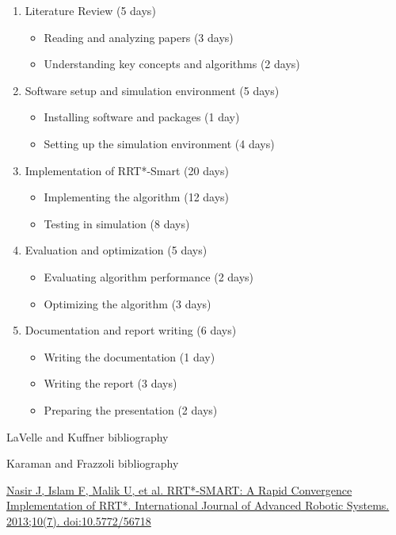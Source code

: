 \documentclass[12pt]{extarticle}
\begin{document}
\begin{enumerate}
	\item Literature Review (5 days)
	\begin{itemize}
		\item Reading and analyzing papers (3 days)
		\item Understanding key concepts and algorithms (2 days)
	\end{itemize}
	
	\item Software setup and simulation environment (5 days)
	\begin{itemize}
		\item Installing software and packages (1 day)
		\item Setting up the simulation environment (4 days)
	\end{itemize}
	
	\item Implementation of RRT*-Smart (20 days)
	\begin{itemize}
		\item Implementing the algorithm (12 days)
		\item Testing in simulation (8 days)
	\end{itemize}

	\item Evaluation and optimization (5 days)
	\begin{itemize}
		\item Evaluating algorithm performance (2 days)
		\item Optimizing the algorithm (3 days)
	\end{itemize}

	\item Documentation and report writing (6 days)
	\begin{itemize}
		\item Writing the documentation (1 day)
		\item Writing the report (3 days)
		\item Preparing the presentation (2 days)
	\end{itemize}
\end{enumerate}
\newpage
\begin{thebibliography}{9}
	LaVelle and Kuffner bibliography

	Karaman and Frazzoli bibliography
	
	\href{https://journals.sagepub.com/doi/10.5772/56718}{Nasir J, Islam F, Malik U, et al. RRT*-SMART: A Rapid Convergence Implementation of RRT*. International Journal of Advanced Robotic Systems. 2013;10(7). doi:10.5772/56718}
\end{thebibliography}
\end{document}
